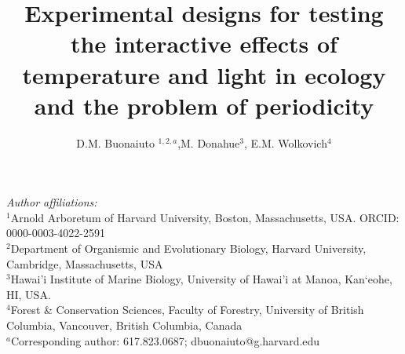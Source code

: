 \documentclass[11pt]{article}
\title{Experimental designs for testing the interactive effects of temperature and light in ecology and the problem of periodicity }
\date{}
\author{D.M. Buonaiuto $^{1,2,a}$,M. Donahue$^{3}$, E.M. Wolkovich$^{4}$}
\begin{document}
\maketitle
\noindent \emph{Author affiliations:}\\
\noindent $^1$Arnold Arboretum of Harvard University, Boston, Massachusetts, USA. ORCID: 0000-0003-4022-2591\\
$^2$Department of Organismic and Evolutionary Biology, Harvard University, Cambridge, Massachusetts, USA \\
$^3$Hawai'i Institute of Marine Biology, University of Hawai'i at Manoa, Kan‘eohe, HI, USA.\\
$^4$Forest \& Conservation Sciences, Faculty of Forestry, University of British Columbia, Vancouver, British Columbia, Canada\\
$^a$Corresponding author: 617.823.0687; dbuonaiuto@g.harvard.edu\\
\pagebreak
\maketitle
\end{document}
